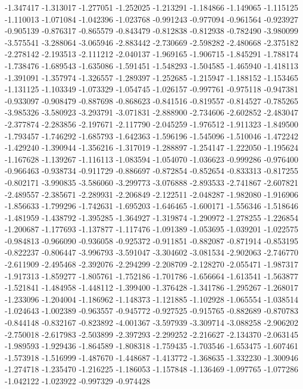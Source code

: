 -1.347417
-1.313017
-1.277051
-1.252025
-1.213291
-1.184866
-1.149065
-1.115125
-1.110013
-1.071084
-1.042396
-1.023768
-0.991243
-0.977094
-0.961564
-0.923927
-0.905139
-0.876317
-0.865579
-0.843479
-0.812838
-0.812938
-0.782490
-3.980099
-3.575541
-3.288064
-3.065946
-2.883442
-2.730669
-2.598282
-2.480668
-2.375182
-2.278142
-2.193513
-2.111212
-2.040137
-1.969165
-1.906715
-1.845291
-1.788174
-1.738476
-1.689543
-1.635086
-1.591451
-1.548293
-1.504585
-1.465940
-1.418113
-1.391091
-1.357974
-1.326557
-1.289397
-1.252685
-1.215947
-1.188152
-1.153465
-1.131125
-1.103349
-1.073329
-1.054745
-1.026157
-0.997761
-0.975118
-0.947381
-0.933097
-0.908479
-0.887698
-0.868623
-0.841516
-0.819557
-0.814527
-0.785265
-3.985326
-3.580923
-3.293791
-3.071831
-2.888900
-2.734606
-2.602852
-2.483047
-2.377874
-2.283856
-2.197671
-2.117790
-2.045259
-1.976512
-1.911323
-1.849500
-1.793457
-1.746292
-1.685793
-1.642363
-1.596196
-1.545096
-1.510046
-1.472242
-1.429240
-1.390944
-1.356216
-1.317019
-1.288897
-1.254147
-1.222050
-1.195624
-1.167628
-1.139267
-1.116113
-1.083594
-1.054070
-1.036623
-0.999286
-0.976400
-0.966463
-0.938734
-0.911729
-0.886697
-0.872854
-0.852654
-0.833313
-0.817255
-0.802171
-3.990835
-3.586060
-3.299773
-3.076888
-2.893533
-2.741867
-2.607821
-2.489557
-2.385671
-2.289931
-2.206849
-2.122511
-2.048287
-1.982080
-1.916906
-1.856633
-1.799296
-1.742631
-1.695203
-1.646465
-1.600171
-1.556346
-1.518646
-1.481959
-1.438792
-1.395285
-1.364927
-1.319874
-1.290972
-1.278255
-1.226854
-1.200687
-1.177693
-1.137877
-1.117476
-1.091389
-1.053695
-1.039201
-1.022575
-0.984813
-0.966090
-0.936058
-0.925372
-0.911851
-0.882087
-0.871914
-0.853195
-0.822237
-0.806447
-3.996793
-3.591047
-3.304602
-3.081534
-2.902063
-2.746770
-2.611909
-2.495468
-2.392076
-2.294299
-2.208709
-2.128270
-2.055471
-1.987317
-1.917313
-1.859277
-1.805761
-1.752186
-1.701786
-1.656664
-1.613541
-1.563877
-1.521841
-1.484958
-1.448112
-1.399400
-1.376428
-1.341786
-1.295267
-1.268017
-1.233096
-1.204004
-1.186962
-1.148373
-1.121885
-1.102928
-1.065554
-1.038514
-1.024643
-1.002389
-0.963557
-0.945772
-0.927525
-0.915765
-0.882689
-0.870783
-0.844148
-0.832167
-0.823892
-4.001367
-3.597939
-3.309714
-3.088258
-2.906202
-2.750018
-2.617983
-2.503899
-2.397293
-2.299252
-2.216627
-2.134370
-2.063145
-1.989593
-1.929436
-1.864589
-1.808318
-1.759435
-1.703546
-1.653475
-1.607461
-1.573918
-1.516999
-1.487670
-1.448687
-1.413772
-1.368635
-1.332230
-1.300946
-1.274718
-1.235470
-1.216225
-1.186053
-1.157848
-1.136469
-1.097765
-1.077286
-1.042122
-1.023922
-0.997329
-0.974428
